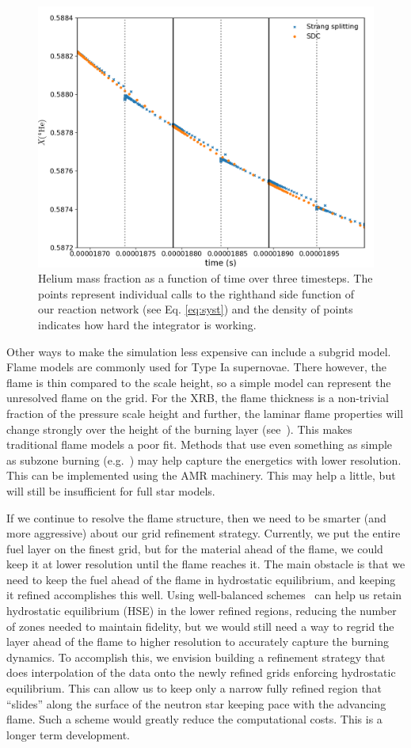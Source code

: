 \documentclass[a4paper]{jpconf}
\begin{document}
\begin{figure}
\centering
\includegraphics[width=0.75\linewidth]{sdc_plot}
\caption{\label{fig:sdc} Helium mass fraction as a function of time
  over three timesteps.  The points represent individual calls to the
  righthand side function of our reaction network (see
  Eq. \ref{eq:syst}) and the density of points indicates how hard the
  integrator is working.}
\end{figure}

Other ways to make the simulation less expensive can include a subgrid
model. Flame models are commonly used for Type Ia supernovae.  There
however, the flame is thin compared to the scale height, so a simple
model can represent the unresolved flame on the grid.  For the XRB,
the flame thickness is a non-trivial fraction of the pressure scale
height and further, the laminar flame properties will change strongly
over the height of the burning layer (see~\cite{Timmes00}).  This
makes traditional flame models a poor fit.  Methods that use even
something as simple as subzone burning (e.g.~\cite{Wang2012190}) may
help capture the energetics with lower resolution.  This can be
implemented using the AMR machinery.  This may help a little, but will
still be insufficient for full star models.

If we continue to resolve the flame structure, then we need to be
smarter (and more aggressive) about our grid refinement strategy.
Currently, we put the entire fuel layer on the finest grid, but for
the material ahead of the flame, we could keep it at lower resolution
until the flame reaches it.  The main obstacle is that we need to keep
the fuel ahead of the flame in hydrostatic equilibrium, and keeping it
refined accomplishes this well.  Using well-balanced
schemes~\cite{kappeli:2016} can help us retain hydrostatic equilibrium
(HSE) in the lower refined regions, reducing the number of zones
needed to maintain fidelity, but we would still need a way to regrid
the layer ahead of the flame to higher resolution to accurately
capture the burning dynamics.  To accomplish this, we envision
building a refinement strategy that does interpolation of the data onto
the newly refined grids enforcing hydrostatic equilibrium.  This can
allow us to keep only a narrow fully refined region that ``slides''
along the surface of the neutron star keeping pace with the advancing
flame.  Such a scheme would greatly reduce the computational costs.
This is a longer term development.
\end{document}
